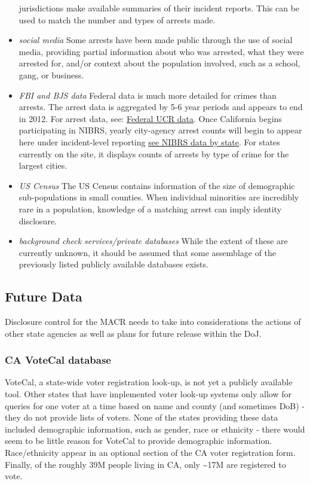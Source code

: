 \documentclass[]{article}
\begin{document}
\begin{itemize}
  jurisdictions make available summaries of their incident reports. This
  can be used to match the number and types of arrests made.
\item
  \emph{social media} Some arrests have been made public through the use
  of social media, providing partial information about who was arrested,
  what they were arrested for, and/or context about the population
  involved, such as a school, gang, or business.
\item
  \emph{FBI and BJS data} Federal data is much more detailed for crimes
  than arrests. The arrest data is aggregated by 5-6 year periods and
  appears to end in 2012. For arrest data, see:
  \href{https://www.ojjdp.gov/ojstatbb/ezaucr/asp/ucr_display.asp}{Federal
  UCR data}. Once California begins participating in NIBRS, yearly
  city-agency arrest counts will begin to appear here under
  incident-level reporting
  \href{https://ucr.fbi.gov/ucr-publications}{see NIBRS data by state}.
  For states currently on the site, it displays counts of arrests by
  type of crime for the largest cities.
\item
  \emph{US Census} The US Census contains information of the size of
  demographic sub-populations in small counties. When individual
  minorities are incredibly rare in a population, knowledge of a
  matching arrest can imply identity disclosure.
\item
  \emph{background check services/private databases} While the extent of
  these are currently unknown, it should be assumed that some assemblage
  of the previously listed publicly available databases exists.
\end{itemize}

\subsection{Future Data}\label{future-data}

Disclosure control for the MACR needs to take into considerations the
actions of other state agencies as well as plans for future release
within the DoJ.

\subsubsection{CA VoteCal database}\label{ca-votecal-database}

VoteCal, a state-wide voter registration look-up, is not yet a publicly
available tool. Other states that have implemented voter look-up systems
only allow for queries for one voter at a time based on name and county
(and sometimes DoB) - they do not provide lists of voters. None of the
states providing these data included demographic information, such as
gender, race or ethnicity - there would seem to be little reason for
VoteCal to provide demographic information. Race/ethnicity appear in an
optional section of the CA voter registration form. Finally, of the
roughly 39M people living in CA, only \textasciitilde{}17M are
registered to vote.
\end{document}
